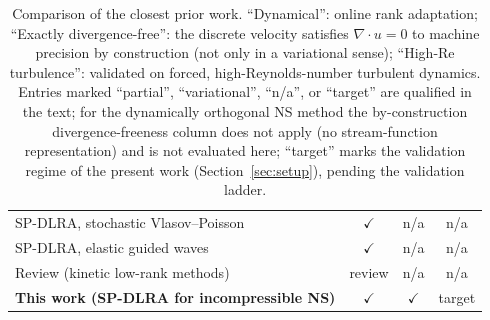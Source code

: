 \begin{table}[h]
\begin{tabular}{@{}lccc@{}}
SP-DLRA, stochastic Vlasov--Poisson \cite{cui2026} & $\checkmark$ & n/a & n/a \\
SP-DLRA, elastic guided waves \cite{goutaudier2026} & $\checkmark$ & n/a & n/a \\
Review (kinetic low-rank methods) \cite{einkemmer2024review} & review & n/a & n/a \\
\midrule
\textbf{This work (SP-DLRA for incompressible NS)} & $\checkmark$ & $\checkmark$ & target \\
\bottomrule
\end{tabular}
\caption{Comparison of the closest prior work. ``Dynamical'': online rank
adaptation; ``Exactly divergence-free'': the discrete velocity satisfies
$\nabla\cdot u = 0$ to machine precision by construction (not only in a
variational sense); ``High-Re turbulence'': validated on forced,
high-Reynolds-number turbulent dynamics. Entries marked ``partial'',
``variational'', ``n/a'', or ``target'' are qualified in the text; for the
dynamically orthogonal NS method the by-construction divergence-freeness
column does not apply (no stream-function representation) and is not
evaluated here; ``target'' marks the validation regime of the present work
(Section~\ref{sec:setup}), pending the validation ladder.}
\label{tab:related}
\end{table}

